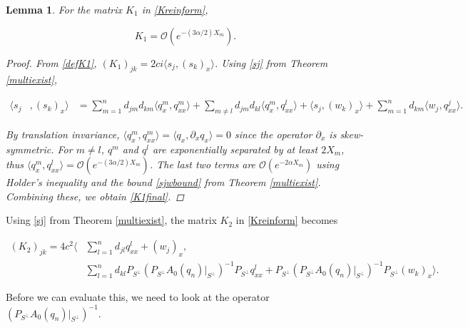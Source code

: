\documentclass[12pt]{article}
\newtheorem{lemma}{Lemma}
\begin{document}
\begin{lemma}\label{K1small}
For the matrix $K_1$ in \eqref{Kreinform}, 

\begin{equation}\label{K1final}
K_1 = \mathcal{O}(e^{-(3 \alpha/2) X_m}).
\end{equation}

\begin{proof}
From \eqref{defK1}, $(K_1)_{jk} = 2 c i \langle s_j, (s_k)_x \rangle$. Using \eqref{sj} from Theorem \ref{multiexist},

\begin{align*}
\langle s_j &, (s_k)_x \rangle 
&= \sum_{m = 1}^{n} d_{jm} d_{km} \langle q^m_x, q^m_{xx} \rangle 
+ \sum_{m \neq l} d_{jm} d_{kl} \langle q^m_x, q^l_{xx} \rangle 
+ \langle s_j, (w_k)_x \rangle 
+ \sum_{m = 1}^{n} d_{km} \langle w_j, q^j_{xx} \rangle.
\end{align*}  

By translation invariance, $\langle q^m_x, q^m_{xx} \rangle = \langle q_x, \partial_x q_x \rangle = 0$ since the operator $\partial_x$ is skew-symmetric. For $m \neq l$, $q^m$ and $q^l$ are exponentially separated by at least $2 X_m$, thus $\langle q^m_x, q^l_{xx} \rangle = \mathcal{O}(e^{-(3 \alpha/2) X_m})$. The last two terms are $\mathcal{O}(e^{-2 \alpha X_m})$ using Holder's inequality and the bound \eqref{sjwbound} from Theorem \ref{multiexist}. Combining these, we obtain \eqref{K1final}.

\end{proof}
\end{lemma}

Using \eqref{sj} from Theorem \eqref{multiexist}, the matrix $K_2$ in \eqref{Kreinform} becomes

\begin{align}\label{K2expansion}
(K_2)_{jk} 
= 4 c^2 \langle &\sum_{l = 1}^{n} d_{jl} q^l_{xx} + (w_j)_x, \\
&\sum_{l = 1}^{n} d_{kl} P_{S^\perp} (P_{S^\perp} A_0(q_n)|_{S^\perp})^{-1} P_{S^\perp} q^l_{xx} + P_{S^\perp} (P_{S^\perp} A_0(q_n)|_{S^\perp})^{-1} P_{S^\perp} (w_k)_x \rangle \nonumber.
\end{align}

Before we can evaluate this, we need to look at the operator $(P_{S^\perp} A_0(q_n)|_{S^\perp})^{-1}$.

\end{document}
